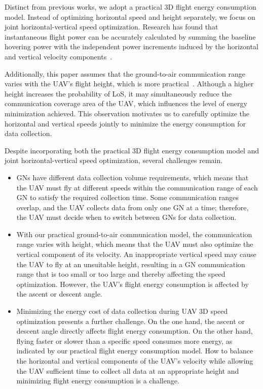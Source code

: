 Distinct from previous works, we adopt a practical 3D flight energy consumption model.
Instead of optimizing horizontal speed and height separately, we focus on joint horizontal-vertical speed optimization.
Research has found that instantaneous flight power can be accurately calculated by summing the baseline hovering power with the independent power increments induced by the horizontal and vertical velocity components~\cite{GongHao, PowerConsumptionModel}.

Additionally, this paper assumes that the ground-to-air communication range varies with the UAV's flight height, which is more practical~\cite{assume}.
Although a higher height increases the probability of LoS, it may simultaneously reduce the communication coverage area of the UAV, which influences the level of energy minimization achieved. 
This observation motivates us to carefully optimize the horizontal and vertical speeds jointly to minimize the energy consumption for data collection.

Despite incorporating both the practical 3D flight energy consumption model and joint horizontal-vertical speed optimization, several challenges remain.

\begin{itemize}
\item 
GNs have different data collection volume requirements, which means that the UAV must fly at different speeds within the communication range of each GN to satisfy the required collection time.
Some communication ranges overlap, and the UAV collects data from only one GN at a time; therefore, the UAV must decide when to switch between GNs for data collection.

\item 
With our practical ground-to-air communication model, the communication range varies with height, which means that the UAV must also optimize the vertical component of its velocity.
An inappropriate vertical speed may cause the UAV to fly at an unsuitable height, resulting in a GN communication range that is too small or too large and thereby affecting the speed optimization.
However, the UAV's flight energy consumption is affected by the ascent or descent angle.

\item 
Minimizing the energy cost of data collection during UAV 3D speed optimization presents a further challenge.
On the one hand, the ascent or descent angle directly affects flight energy consumption.
On the other hand, flying faster or slower than a specific speed consumes more energy, as indicated by our practical flight energy consumption model.
How to balance the horizontal and vertical components of the UAV’s velocity while allowing the UAV sufficient time to collect all data at an appropriate height and minimizing flight energy consumption is a challenge.
\end{itemize}


